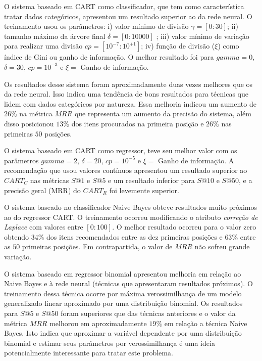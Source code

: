 \documentclass[10pt]{article}
\begin{document}
O sistema baseado em CART como classificador, que tem como característica tratar dados categóricos, apresentou um resultado superior ao da rede neural. O treinamento usou os parâmetros: i) valor mínimo de divisão \(\gamma = [0:30]\); ii) tamanho máximo da árvore final \(\delta = [0:10000]\) ; iii) valor mínimo de variação para realizar uma divisão \(cp = [10^{-7}:10^{+1}]\); iv) função de divisão (\(\xi\)) como índice de Gini ou ganho de informação. O melhor resultado foi para \(gamma = 0\), \(\delta = 30\), \(cp = 10^{-3}\) e \(\xi = \) Ganho de informação. 

Os resultados desse sistema foram aproximadamente duas vezes melhores que os da rede neural. Isso indica uma tendência de bons resultados para técnicas que lidem com dados categóricos por natureza. Essa melhoria indicou um aumento de \(26\%\) na métrica \(MRR\) que representa um aumento da precisão do sistema, além disso posicionou \(13\%\) dos itens procurados na primeira posição e \(26\%\) nas primeiras \(50\) posições.

O sistema baseado em CART como regressor, teve seu melhor valor com os parâmetros \(gamma = 2\), \(\delta = 20\), \(cp = 10^{-5}\) e \(\xi = \) Ganho de informação. A recomendação que usou valores contínuos apresentou um resultado superior ao \(CART_{C}\) nas métricas \(S@1\) e \(S@5\) e um resultado inferior para \(S@10\) e \(S@50\), e a precisão geral (MRR) do \(CART_R\) foi levemente superior.

O sistema baseado no classificador Naive Bayes obteve resultados muito próximos ao do regressor CART. O treinamento ocorreu modificando o atributo \emph{correção de Laplace} com valores entre \([0:100]\). O melhor resultado ocorreu para o valor zero obtendo \(34\%\) dos itens recomendados entre as dez primeiras posições e \(63\%\) entre as \(50\) primeiras posições. Em contrapartida, o valor de \(MRR\) não sofreu grande variação.

O sistema baseado em regressor binomial apresentou melhoria em relação ao Naive Bayes e à rede neural (técnicas que apresentaram resultados próximos). O treinamento dessa técnica ocorre por máxima verossimilhança de um modelo generalizado linear aproximado por uma distribuição binomial. Os resultados para \(S@5\) e \(S@50\) foram superiores que das técnicas anteriores e o valor da métrica \(MRR\) melhorou em aproximadamente \(19\%\) em relação a técnica Naive Bayes. Isto indica que aproximar a variável dependente por uma distribuição binomial e estimar seus parâmetros por verossimilhança é uma ideia potencialmente interessante para tratar este problema.
\end{document}
